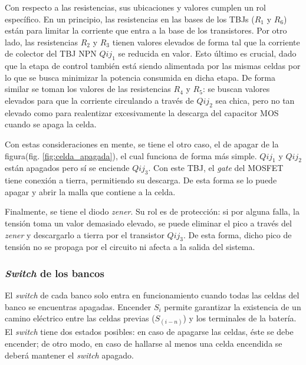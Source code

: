 Con respecto a las resistencias, sus ubicaciones y valores cumplen un rol específico. En un principio, las resistencias en las bases de los TBJs ($R_1$ y $R_6$) están para limitar la corriente que entra a la base de los transistores. Por otro lado, las resistencias $R_2$ y $R_3$ tienen valores elevados de forma tal que la corriente de colector del TBJ NPN $Qij_1$ se reducida en valor. Esto último es crucial, dado que la etapa de control también está siendo alimentada por las mismas celdas por lo que se busca minimizar la potencia consumida en dicha etapa. De forma similar se toman los valores de las resistencias $R_4$ y $R_5$: se buscan valores elevados para que la corriente circulando a través de $Qij_2$ sea chica, pero no tan elevado como para realentizar excesivamente la descarga del capacitor MOS cuando se apaga la celda.

Con estas consideraciones en mente, se tiene el otro caso, el de apagar de la figura(fig.  \ref{fig:celda_apagada}), el cual funciona de forma más simple. $Qij_1$ y $Qij_2$ están apagados pero sí se enciende $Qij_3$. Con este TBJ, el \textit{gate} del MOSFET tiene conexión a tierra, permitiendo su descarga. De esta forma se lo puede apagar y abrir la malla que contiene a la celda.

Finalmente, se tiene el diodo \textit{zener}. Su rol es de protección: si por alguna falla, la tensión toma un valor demasiado elevado, se puede eliminar el pico a través del \textit{zener} y descargarlo a tierra por el transistor $Qij_3$. De esta forma, dicho pico de tensión no se propaga por el circuito ni afecta a la salida del sistema.

\subsubsection{\textit{Switch} de los bancos}


El \textit{switch} de cada banco solo entra en funcionamiento cuando todas las celdas del banco se encuentras apagadas. Encender $S_i$ permite garantizar la existencia de un camino eléctrico entre las celdas previas ($S_{(i-n)}$) y los terminales de la batería. El \textit{switch} tiene dos estados posibles: en caso de apagarse las celdas, éste se debe encender; de otro modo, en caso de hallarse al menos una celda encendida se deberá mantener el \textit{switch} apagado.

